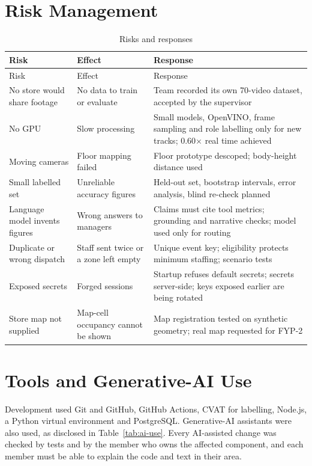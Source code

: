 \section{Risk Management}
\begin{longtable}{P{0.22\textwidth}P{0.34\textwidth}P{0.36\textwidth}}
\caption{Risks and responses}\label{tab:risks}\\
\toprule
Risk & Effect & Response\\
\midrule
\endfirsthead
\toprule
Risk & Effect & Response\\
\midrule
\endhead
\bottomrule
\endfoot
No store would share footage & No data to train or evaluate & Team recorded its own 70-video dataset, accepted by the supervisor\\
No GPU & Slow processing & Small models, OpenVINO, frame sampling and role labelling only for new tracks; 0.60$\times$ real time achieved\\
Moving cameras & Floor mapping failed & Floor prototype descoped; body-height distance used\\
Small labelled set & Unreliable accuracy figures & Held-out set, bootstrap intervals, error analysis, blind re-check planned\\
Language model invents figures & Wrong answers to managers & Claims must cite tool metrics; grounding and narrative checks; model used only for routing\\
Duplicate or wrong dispatch & Staff sent twice or a zone left empty & Unique event key; eligibility protects minimum staffing; scenario tests\\
Exposed secrets & Forged sessions & Startup refuses default secrets; secrets server-side; keys exposed earlier are being rotated\\
Store map not supplied & Map-cell occupancy cannot be shown & Map registration tested on synthetic geometry; real map requested for FYP-2\\
\end{longtable}

\section{Tools and Generative-AI Use}
Development used Git and GitHub, GitHub Actions, CVAT for labelling, Node.js, a Python virtual environment and PostgreSQL. Generative-AI assistants were also used, as disclosed in Table~\ref{tab:ai-use}. Every AI-assisted change was checked by tests and by the member who owns the affected component, and each member must be able to explain the code and text in their area.

